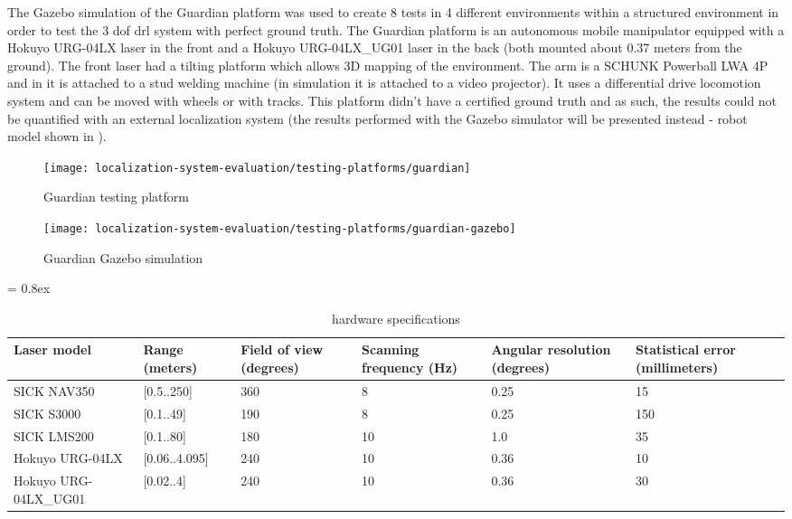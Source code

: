 The Gazebo simulation of the Guardian platform was used to create 8 tests in 4 different environments within a structured environment in order to test the 3 \gls{dof} \gls{drl} system with perfect ground truth. The Guardian platform is an autonomous mobile manipulator equipped with a Hokuyo URG-04LX laser in the front and a Hokuyo URG-04LX\_UG01 laser in the back (both mounted about 0.37 meters from the ground). The front laser had a tilting platform which allows 3D mapping of the environment. The arm is a SCHUNK Powerball LWA 4P and in  it is attached to a stud welding machine (in simulation it is attached to a video projector). It uses a differential drive locomotion system and can be moved with wheels or with tracks. This platform didn't have a certified ground truth and as such, the results could not be quantified with an external localization system (the results performed with the Gazebo simulator will be presented instead - robot model shown in ).

\begin{figure}[H]
	\centering
	\begin{minipage}[b]{0.24\textwidth}
		\centering
		\texttt{[image: localization-system-evaluation/testing-platforms/guardian]}
		\caption{Guardian testing platform}
		\label{fig:localization-system-evaluation_guardian}
	\end{minipage}\hfill
	\begin{minipage}[b]{0.24\textwidth}
		\centering
		\texttt{[image: localization-system-evaluation/testing-platforms/guardian-gazebo]}
		\caption{Guardian Gazebo simulation}
		\label{fig:localization-system-evaluation_guardian_gazebo}
	\end{minipage}
\end{figure}


\begin{table*}[t]
	\caption{ hardware specifications}
	\tabulinesep = 0.8ex
	\centering
	\small
	\begin{tabu} { X[2.5,m,c] | X[m,c] X[m,c] X[m,c] X[m,c] X[m,c] }
		\rowfont{\bfseries\itshape\small} Laser model & Range (meters) & Field of view (degrees) & Scanning frequency (Hz) & Angular resolution (degrees) & Statistical error (millimeters) \\
		\hline
		{\small SICK NAV350} 			& [0.5..250] 	& 360 	& 8 	& 0.25 	& 15 	\\
		{\small SICK S3000} 			& [0.1..49] 	& 190 	& 8 	& 0.25 	& 150 	\\
		{\small SICK LMS200} 			& [0.1..80] 	& 180 	& 10 	& 1.0 	& 35 	\\
		{\small Hokuyo URG-04LX} 		& [0.06..4.095] & 240 	& 10 	& 0.36 	& 10 	\\
		{\small Hokuyo URG-04LX\_UG01} 	& [0.02..4] 	& 240 	& 10 	& 0.36 	& 30 	\\
	\end{tabu}
	\label{tab:localization-system-evaluation_laser-hardware-specifications}
\end{table*}



